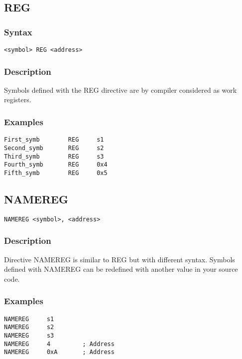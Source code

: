     \subsection{REG}
        \subsubsection{Syntax}
            \verb'<symbol> REG <address>'

        \subsubsection{Description}
            Symbols defined with the REG directive are by compiler considered as work registers.

        \subsubsection{Examples}
            \verb'First_symb        REG     s1'\\
            \verb'Second_symb       REG     s2'\\
            \verb'Third_symb        REG     s3'\\
            \verb'Fourth_symb       REG     0x4'\\
            \verb'Fifth_symb        REG     0x5'

        \subsection{NAMEREG}
            \verb'NAMEREG <symbol>, <address> '

        \subsubsection{Description}
            Directive NAMEREG is similar to REG but with different syntax. Symbols defined with NAMEREG can be redefined with another value in your source code.

        \subsubsection{Examples}
            \verb'NAMEREG     s1'\\
            \verb'NAMEREG     s2'\\
            \verb'NAMEREG     s3'\\
            \verb'NAMEREG     4         ; Address'\\
            \verb'NAMEREG     0xA       ; Address'

